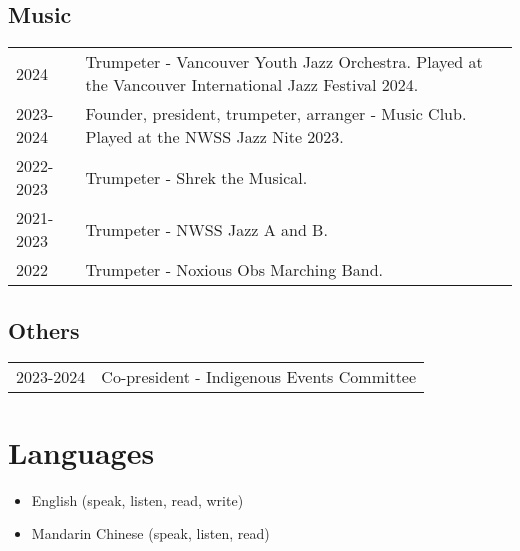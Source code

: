 \documentclass{article}
\begin{document}
\subsection*{Music}

\begin{tabular}{@{}ll}
	2024      & Trumpeter - Vancouver Youth Jazz Orchestra. Played at the Vancouver International Jazz Festival 2024. \\
	2023-2024 & Founder, president, trumpeter, arranger - Music Club. Played at the NWSS Jazz Nite 2023.              \\
	2022-2023 & Trumpeter - Shrek the Musical.                                                                        \\
	2021-2023 & Trumpeter - NWSS Jazz A and B.                                                                        \\
	2022      & Trumpeter - Noxious Obs Marching Band.
\end{tabular}

\subsection*{Others}

\begin{tabular}{@{}ll}
	2023-2024 & Co-president - Indigenous Events Committee
\end{tabular}

\section*{Languages}

\begin{itemize}
	\item English (speak, listen, read, write)
	\item Mandarin Chinese (speak, listen, read)
\end{itemize}
\end{document}
